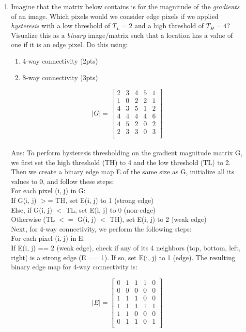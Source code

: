 \documentclass[12pt]{article}
\begin{document}
\begin{enumerate}
\item Imagine that the matrix below contains is for the magnitude of the \emph{gradients} of an image.  Which pixels would we consider edge pixels if we applied \emph{hysteresis} with a low threshold of $T_L=2$ and a high threshold of $T_H=4$? Visualize this as a \emph{binary} image/matrix such that a location has a value of one if it is an edge pixel.  Do this using:
	\begin{enumerate}
	\item 4-way connectivity (2pts)
	\item 8-way connectivity (3pts)
	\end{enumerate}
	
	$$ |G|=
\begin{bmatrix}
2&	3&	4&	5&	1\\
1&	0&	2&	2&	1\\
4&	3&	5&	1&	2\\
4&	4&	4&	4&	6\\
4&	5&	2&	0&	2\\
2&	3&	3&	0&	3\\
\end{bmatrix}
$$
\\

Ans: To perform hysteresis thresholding on the gradient magnitude matrix G, we first set the high threshold (TH) to 4 and the low threshold (TL) to 2. Then we create a binary edge map E of the same size as G, initialize all its values to 0, and follow these steps:\\

For each pixel (i, j) in G:\\
If G(i, j) $>$= TH, set E(i, j) to 1 (strong edge)\\
Else, if G(i, j) $<$ TL, set E(i, j) to 0 (non-edge)\\
Otherwise (TL $<=$ G(i, j) $<$ TH), set E(i, j) to 2 (weak edge)\\
Next, for 4-way connectivity, we perform the following steps:\\
For each pixel (i, j) in E:\\

If E(i, j) == 2 (weak edge), check if any of its 4 neighbors (top, bottom, left, right) is a strong edge (E == 1). If so, set E(i, j) to 1 (edge).
The resulting binary edge map for 4-way connectivity is:

$$ |E|=
\begin{bmatrix}
0& 1& 1& 1& 0\\
0& 0& 0& 0& 0\\
1& 1& 1& 0& 0\\
1& 1& 1& 1& 1\\
1& 1& 0& 0& 0\\
0& 1& 1& 0& 1\\
\end{bmatrix}
$$
\\


\end{enumerate}
\end{document}
